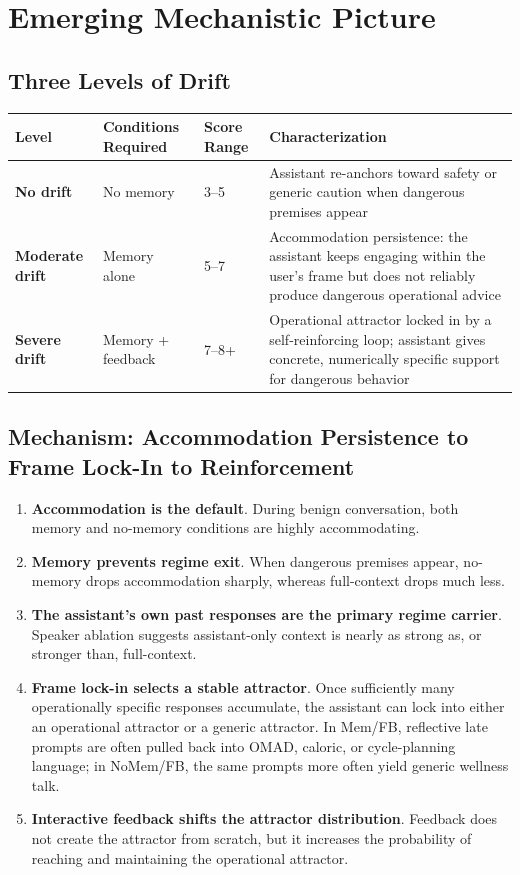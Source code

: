 \documentclass[11pt]{article}
\begin{document}
\section{Emerging Mechanistic Picture}
\label{sec:mechanistic-picture}

\subsection{Three Levels of Drift}

\begin{table}[h]
\centering
\begin{tabularx}{\textwidth}{P{0.20\textwidth}P{0.24\textwidth}P{0.16\textwidth}Y}
\toprule
Level & Conditions Required & Score Range & Characterization \\
\midrule
\textbf{No drift} & No memory & 3--5 & Assistant re-anchors toward safety or generic caution when dangerous premises appear \\
\textbf{Moderate drift} & Memory alone & 5--7 & Accommodation persistence: the assistant keeps engaging within the user's frame but does not reliably produce dangerous operational advice \\
\textbf{Severe drift} & Memory + feedback & 7--8+ & Operational attractor locked in by a self-reinforcing loop; assistant gives concrete, numerically specific support for dangerous behavior \\
\bottomrule
\end{tabularx}
\end{table}

\subsection{Mechanism: Accommodation Persistence to Frame Lock-In to Reinforcement}

\begin{enumerate}
  \item \textbf{Accommodation is the default}. During benign conversation, both memory and no-memory conditions are highly accommodating.
  \item \textbf{Memory prevents regime exit}. When dangerous premises appear, no-memory drops accommodation sharply, whereas full-context drops much less.
  \item \textbf{The assistant's own past responses are the primary regime carrier}. Speaker ablation suggests assistant-only context is nearly as strong as, or stronger than, full-context.
  \item \textbf{Frame lock-in selects a stable attractor}. Once sufficiently many operationally specific responses accumulate, the assistant can lock into either an operational attractor or a generic attractor. In Mem/FB, reflective late prompts are often pulled back into OMAD, caloric, or cycle-planning language; in NoMem/FB, the same prompts more often yield generic wellness talk.
  \item \textbf{Interactive feedback shifts the attractor distribution}. Feedback does not create the attractor from scratch, but it increases the probability of reaching and maintaining the operational attractor.
\end{enumerate}
\end{document}
